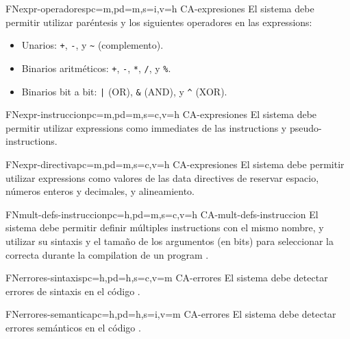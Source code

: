 \begin{softwareReq}{FN}{expr-operadores}{pc=m,pd=m,s=i,v=h}
    {CA-expresiones}
    El sistema debe permitir utilizar paréntesis y los siguientes operadores en
    las \glspl{expression}:
    \begin{itemize}
        \item Unarios: \verb!+!, \verb!-!, y \verb!~! (complemento).
        \item Binarios aritméticos: \verb!+!, \verb!-!, \verb!*!, \verb!/!, y \verb!%!.
        \item Binarios bit a bit: \verb!|! (OR), \verb!&! (AND), y \verb!^! (XOR).
    \end{itemize}
\end{softwareReq}

\begin{softwareReq}{FN}{expr-instruccion}{pc=m,pd=m,s=c,v=h}
    {CA-expresiones}
    El sistema debe permitir utilizar \glspl{expression} como \glspl{immediate}
    de las \glspl{instruction} y \glspl{pseudo-instruction}.
\end{softwareReq}

\begin{softwareReq}{FN}{expr-directiva}{pc=m,pd=m,s=c,v=h}
    {CA-expresiones}
    El sistema debe permitir utilizar \glspl{expression} como valores de las
    \glspl{data directive} de reservar espacio, números enteros y decimales, y
    alineamiento.
\end{softwareReq}

\begin{softwareReq}{FN}{mult-defs-instruccion}{pc=h,pd=m,s=c,v=h}
    {CA-mult-defs-instruccion}
    El sistema debe permitir definir múltiples \glspl{instruction} con el mismo
    nombre, y utilizar su sintaxis y el tamaño de los argumentos (en bits) para
    seleccionar la correcta durante la \gls{compilation} de un \gls{program}
    .
\end{softwareReq}

\begin{softwareReq}{FN}{errores-sintaxis}{pc=h,pd=h,s=c,v=m}
    {CA-errores}
    El sistema debe detectar errores de sintaxis en el código .
\end{softwareReq}

\begin{softwareReq}{FN}{errores-semantica}{pc=h,pd=h,s=i,v=m}
    {CA-errores}
    El sistema debe detectar errores semánticos en el código .
\end{softwareReq}


